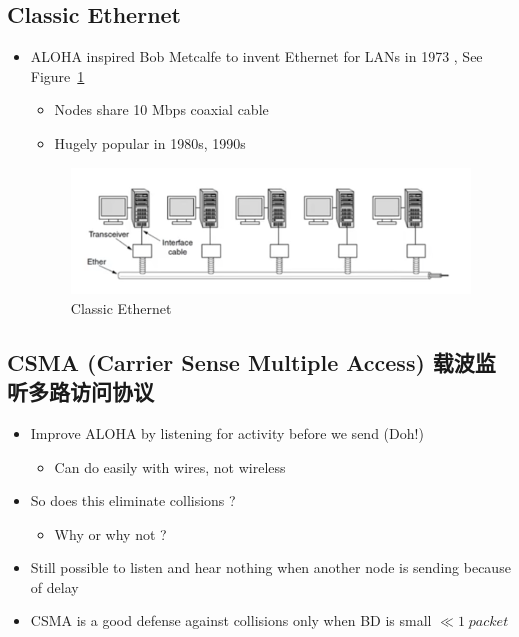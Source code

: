 \documentclass[12pt]{ctexart}   %
\begin{document}
	\subsection{Classic Ethernet}
	\begin{itemize}
		\item ALOHA inspired Bob Metcalfe to invent Ethernet for LANs in 1973 , See Figure~\ref{fig:3-4-3}
		\begin{itemize}
			\item Nodes share 10 Mbps coaxial cable
			\item Hugely popular in 1980s, 1990s
		\end{itemize}
		
		\begin{figure}[h!] %
		\centering
		 \includegraphics[scale=0.7]{images/3-4-3}
		\caption{ Classic Ethernet }
		 \label{fig:3-4-3}
		 \end{figure}
	\end{itemize}
	
	\subsection{CSMA (Carrier Sense Multiple Access) 载波监听多路访问协议 }
	\begin{itemize}
		\item Improve ALOHA by listening for activity before we send (Doh!)
		\begin{itemize}
			\item Can do easily with wires, not wireless
		\end{itemize}
		
		\item So does this eliminate collisions ?
		\begin{itemize}
			\item Why or why not ?
		\end{itemize}
		
		\item Still possible to listen and hear nothing when another node is sending because of delay
		
		\item CSMA is a good defense against collisions only when BD is small       $ \ll  1 \; packet$
	\end{itemize}
	
\end{document}
